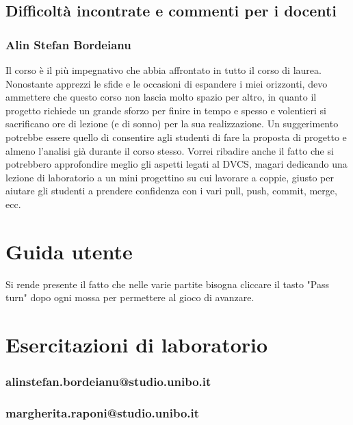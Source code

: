 \documentclass[a4paper,12pt]{report}
\begin{document}
\section{Difficoltà incontrate e commenti per i docenti}

\subsection{Alin Stefan Bordeianu}
Il corso è il più impegnativo che abbia affrontato in tutto il corso di laurea. Nonostante apprezzi le sfide e le occasioni di espandere i miei orizzonti, devo ammettere che questo corso non lascia molto spazio per altro, in quanto il progetto richiede un grande sforzo per finire in tempo e spesso e volentieri si sacrificano ore di lezione (e di sonno) per la sua realizzazione. Un suggerimento potrebbe essere quello di consentire agli studenti di fare la proposta di progetto e almeno l'analisi già durante il corso stesso. Vorrei ribadire anche il fatto che si potrebbero approfondire meglio gli aspetti legati al DVCS, magari dedicando una lezione di laboratorio a un mini progettino su cui lavorare a coppie, giusto per aiutare gli studenti a prendere confidenza con i vari pull, push, commit, merge, ecc.


\appendix

\chapter{Guida utente}

Si rende presente il fatto che nelle varie partite bisogna cliccare il tasto "Pass turn" dopo ogni mossa per permettere al gioco di avanzare.

\chapter{Esercitazioni di laboratorio}

\subsection{alinstefan.bordeianu@studio.unibo.it}

\subsection{margherita.raponi@studio.unibo.it}
\end{document}
